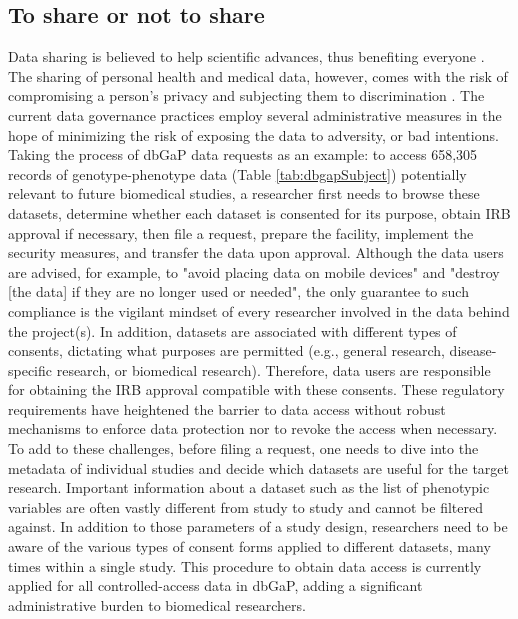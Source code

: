 \documentclass[letter]{bib}
\newcounter{example}[subsection]
\begin{document}
	
	\subsection*{To share or not to share}
	Data sharing is believed to help scientific advances, thus benefiting everyone \citep{GA4GH:2014:Framework}. The sharing of personal health and medical data, however, comes with the risk of compromising a person's privacy and subjecting them to discrimination \citep{P3gConsortium:2009:Public,GA4GH:2014:Framework,Shringarpure:2015:Privacy}.  The current data governance practices employ several administrative measures in the hope of minimizing the risk of exposing the data to adversity, or bad intentions. Taking the process of dbGaP data requests as an example: to access 658,305 records of genotype-phenotype data (Table \ref{tab:dbgapSubject}) potentially relevant to future biomedical studies, a researcher first needs to browse these datasets, determine whether each dataset is consented for its purpose, obtain IRB approval if necessary, then file a request, prepare the facility, implement the security measures, and transfer the data upon approval. Although the data users are advised, for example, to "avoid placing data on mobile devices" and "destroy [the data] if they are no longer used or needed", the only guarantee to such compliance is the vigilant mindset of every researcher involved in the data behind the project(s).  In addition, datasets are associated with different types of consents, dictating what purposes are permitted (e.g., general research, disease-specific research, or biomedical research). Therefore, data users are responsible for obtaining the IRB approval compatible with these consents. These regulatory requirements have heightened the barrier to data access without robust mechanisms to enforce data protection nor to revoke the access when necessary.  To add to these challenges, before filing a request, one needs to dive into the metadata of individual studies and decide which datasets are useful for the target research. Important information about a dataset such as the list of phenotypic variables are often vastly different from study to study and cannot be filtered against. In addition to those parameters of a study design, researchers need to be aware of the various types of consent forms applied to different datasets, many times within a single study. This procedure to obtain data access is currently applied for all controlled-access data in dbGaP, adding a significant administrative burden to biomedical researchers.
\end{document}
